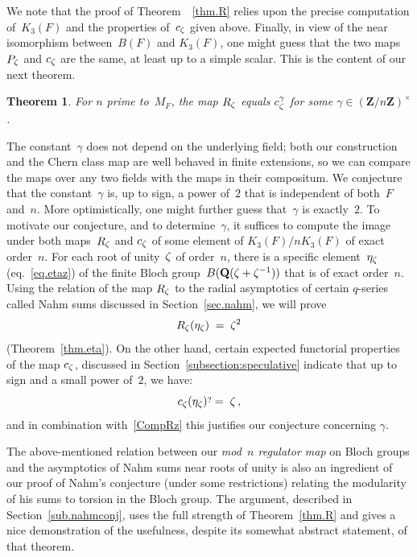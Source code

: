 \documentclass[12pt,reqno]{amsart}
\newtheorem{theorem}{Theorem}[section]
\theoremstyle{definition}
\newcommand{\frankchanged}[1]{{#1}}
\newcommand{\rmk}[1]{{\color{blue} {\rm [#1]}}}
\def\be{\begin{equation}}
\def\ee{\end{equation}}
\def\={\;=\;}
\def\Q{\mathbf Q}   %
\def\Z{\mathbf Z}   %
\def\nn{n}
\begin{document}
We note that the proof of Theorem~~\ref{thm.R} relies upon the precise 
computation of~$K_3(F)$ and the properties of~$c_{\zeta}$ given above.
Finally, in view of the near isomorphism between~$B(F)$ and $K_3(F)$, one 
might guess that the two maps $P_\zeta$ and $c_\zeta$ are the same, at least up to 
a simple scalar.
This is the content of our next theorem. 

\begin{theorem}
\label{thm.cR}
For $\nn$ prime to~$M_F$, the map $R_\zeta$ equals $c_\zeta^\gamma$ for some 
$\gamma\in(\Z/\nn\Z)^{\times}$.
\end{theorem}
The constant~$\gamma$ does not depend on the underlying field;
both our construction and the Chern class map are well behaved in finite 
extensions, so we can compare the maps over any two fields with
the maps in their compositum. 
We conjecture that the constant~$\gamma$ is, up to sign, a power 
of~$2$ that is independent of \frankchanged{both~$F$} and~$\nn$. \frankchanged{More
optimistically, one might
further guess that~$\gamma$ is exactly~$2$.}
To \frankchanged{motivate} our conjecture,
and to determine~$\gamma$, it suffices 
to compute the image under both maps~$R_\zeta$ and $c_\zeta$ of some element of 
$K_3(F)/\nn K_3(F)$ of exact 
order~$\nn$. For each root of unity~$\zeta$ of order~$\nn$, there is a specific 
element~$\eta_{\zeta}$ (eq.~\eqref{eq.etaz})
of the finite Bloch group~$B(\Q(\z+\z\i))$ that is of 
exact order~$\nn$. Using the relation of the map $R_\zeta$ to the radial 
asymptotics of certain $q$-series called Nahm sums discussed in 
Section~\ref{sec.nahm}, we will prove
\be
\label{CompRz}
R_\z(\eta_\z) \= \z^2
\ee
(Theorem~\ref{thm.eta}). On the other hand, certain expected functorial 
properties of the map $c_\zeta$, discussed in Section~\ref{subsection:speculative} 
indicate that up to sign and a small power of~$2$, we have:
\be
\label{Compcz}
c_\z(\eta_\z) \overset{?} 
\= \z\,,
\ee
and in combination with~\eqref{CompRz} this justifies our conjecture
concerning $\gamma$.

The above-mentioned relation between our \emph{mod~$n$ regulator map} 
on Bloch groups and the asymptotics of Nahm sums near roots of unity is also 
an ingredient of our proof of Nahm's conjecture (under some 
restrictions) relating the modularity of his sums to torsion in the Bloch 
group.  The argument, described in Section~\ref{sub.nahmconj}, uses the full 
strength of Theorem~\ref{thm.R} and gives a nice demonstration of the 
usefulness, despite its somewhat abstract statement, of that theorem.
\end{document}
